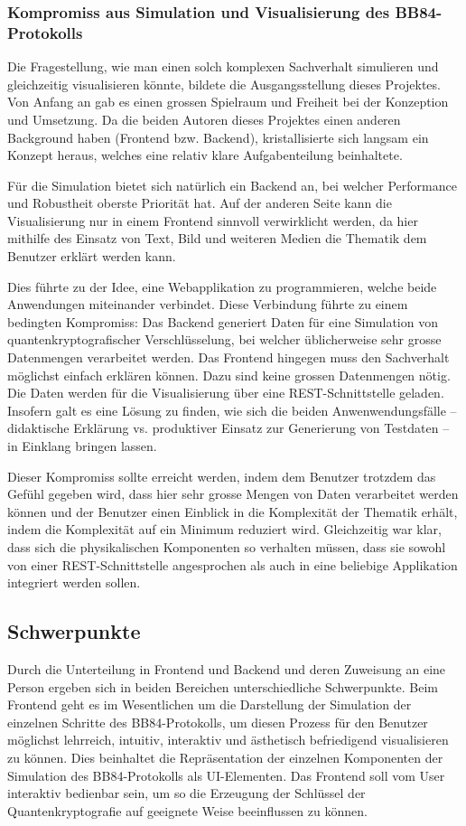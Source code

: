 \documentclass[a4paper,10.2pt,pdftex]{scrartcl}%
\begin{document}
\subsubsection{Kompromiss aus Simulation und Visualisierung des BB84-Protokolls}
Die Fragestellung, wie man einen solch komplexen Sachverhalt simulieren und gleichzeitig visualisieren könnte, bildete die Ausgangsstellung dieses Projektes. Von Anfang an gab es einen grossen Spielraum und Freiheit bei der Konzeption und Umsetzung. Da die beiden Autoren dieses Projektes einen anderen Background haben (Frontend bzw. Backend), kristallisierte sich langsam ein Konzept heraus, welches eine relativ klare Aufgabenteilung beinhaltete.

Für die Simulation bietet sich natürlich ein Backend an, bei welcher Performance und Robustheit oberste Priorität hat. Auf der anderen Seite kann die Visualisierung nur in einem Frontend sinnvoll verwirklicht werden, da hier mithilfe des Einsatz von Text, Bild und weiteren Medien die Thematik dem Benutzer erklärt werden kann.

Dies führte zu der Idee, eine Webapplikation zu programmieren, welche beide Anwendungen miteinander verbindet. Diese Verbindung führte zu einem bedingten Kompromiss: Das Backend generiert Daten für eine Simulation von quantenkryptografischer Verschlüsselung, bei welcher üblicherweise sehr grosse Datenmengen verarbeitet werden. Das Frontend hingegen muss den Sachverhalt möglichst einfach erklären können. Dazu sind keine grossen Datenmengen nötig. Die Daten werden für die Visualisierung über eine REST-Schnittstelle geladen. Insofern galt es eine Lösung zu finden, wie sich die beiden Anwenwendungsfälle -- didaktische Erklärung vs. produktiver Einsatz zur Generierung von Testdaten -- in Einklang bringen lassen.  

Dieser Kompromiss sollte erreicht werden, indem dem Benutzer trotzdem das Gefühl gegeben wird, dass hier sehr grosse Mengen von Daten verarbeitet werden können und der Benutzer einen Einblick in die Komplexität der Thematik erhält, indem die Komplexität auf ein Minimum reduziert wird. Gleichzeitig war klar, dass sich die physikalischen Komponenten so verhalten müssen, dass sie sowohl von einer REST-Schnittstelle angesprochen als auch in eine beliebige Applikation integriert werden sollen. 
 



\subsection{Schwerpunkte}
Durch die Unterteilung in Frontend und Backend und deren Zuweisung an eine Person ergeben sich in beiden Bereichen unterschiedliche Schwerpunkte. Beim Frontend geht es im Wesentlichen um die Darstellung der Simulation der einzelnen Schritte des BB84-Protokolls, um diesen Prozess für den Benutzer möglichst lehrreich, intuitiv, interaktiv und ästhetisch befriedigend visualisieren zu können. Dies beinhaltet die Repräsentation der einzelnen Komponenten der Simulation des BB84-Protokolls als UI-Elementen. Das Frontend soll vom User interaktiv bedienbar sein, um so die Erzeugung der Schlüssel der Quantenkryptografie auf geeignete Weise beeinflussen zu können.
\end{document}
